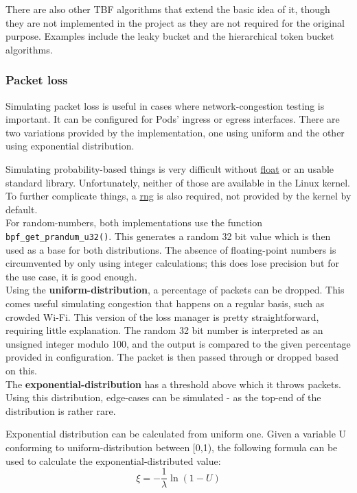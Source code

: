 There are also other TBF algorithms that extend the basic idea of it, though they are not implemented in the project as they are not required for the original purpose. Examples include the leaky bucket and the hierarchical token bucket algorithms.

\subsubsection{Packet loss}
Simulating packet loss is useful in cases where network-congestion testing is important. It can be configured for Pods' ingress or egress interfaces. There are two variations provided by the implementation, one using uniform and the other using exponential distribution.

Simulating probability-based things is very difficult without \underline{\gls{float}} or an usable standard library. Unfortunately, neither of those are available in the Linux kernel. To further complicate things, a \underline{\gls{rng}} is also required, not provided by the kernel by default. \\

For random-numbers, both implementations use the function \texttt{bpf\_get\_prandum\_u32()}. This generates a random 32 bit value which is then used as a base for both distributions. The absence of floating-point numbers is circumvented by only using integer calculations; this does lose precision but for the use case, it is good enough. \\

Using the \textbf{uniform-distribution}, a percentage of packets can be dropped. This comes useful simulating congestion that happens on a regular basis, such as crowded Wi-Fi. This version of the loss manager is pretty straightforward, requiring little explanation. The random 32 bit number is interpreted as an unsigned integer modulo 100, and the output is compared to the given percentage provided in configuration. The packet is then passed through or dropped based on this. \\

The \textbf{exponential-distribution} has a threshold above which it throws packets. Using this distribution, edge-cases can be simulated - as the top-end of the distribution is rather rare.

Exponential distribution can be calculated from uniform one. Given a variable U conforming to uniform-distribution between [0,1), the following formula can be used to calculate the exponential-distributed value:
$$\xi = -\frac{1}{\lambda}\ln(1-U)$$

